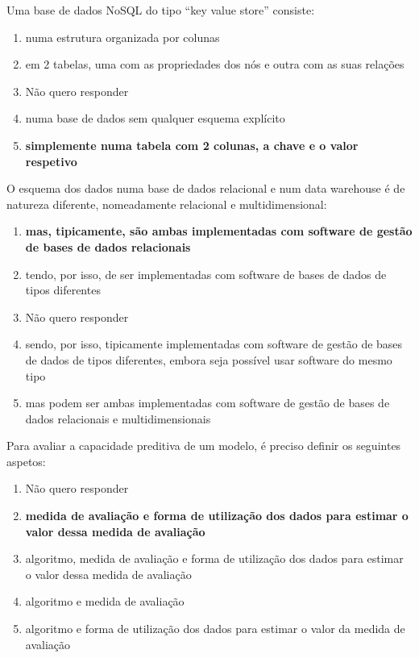 \documentclass[type=recurso, year=2015/16]{bdad_exam}
\begin{document}
{
Uma base de dados NoSQL do tipo ``key value store'' consiste:
\begin{enumerate}[label=\alph*.]\itemsep0em
    \item numa estrutura organizada por colunas
    \item em 2 tabelas, uma com as propriedades dos nós e outra com as suas relações
    \item Não quero responder
    \item numa base de dados sem qualquer esquema explícito
    \item \textbf{simplemente numa tabela com 2 colunas, a chave e o valor respetivo \greencheckmark}
\end{enumerate}

O esquema dos dados numa base de dados relacional e num data warehouse é de natureza diferente, nomeadamente relacional e multidimensional:
\begin{enumerate}[label=\alph*.]\itemsep0em
    \item \textbf{mas, tipicamente, são ambas implementadas com software de gestão de bases de dados relacionais \greencheckmark}
    \item tendo, por isso, de ser implementadas com software de bases de dados de tipos diferentes
    \item Não quero responder
    \item sendo, por isso, tipicamente implementadas com software de gestão de bases de dados de tipos diferentes, embora seja possível usar software do mesmo tipo
    \item mas podem ser ambas implementadas com software de gestão de bases de dados relacionais e multidimensionais
\end{enumerate}

Para avaliar a capacidade preditiva de um modelo, é preciso definir os seguintes aspetos:
\begin{enumerate}[label=\alph*.]\itemsep0em
    \item Não quero responder
    \item \textbf{medida de avaliação e forma de utilização dos dados para estimar o valor dessa medida de avaliação \greencheckmark}
    \item algoritmo, medida de avaliação e forma de utilização dos dados para estimar o valor dessa medida de avaliação
    \item algoritmo e medida de avaliação
    \item algoritmo e forma de utilização dos dados para estimar o valor da medida de avaliação
\end{enumerate}

}
\end{document}

